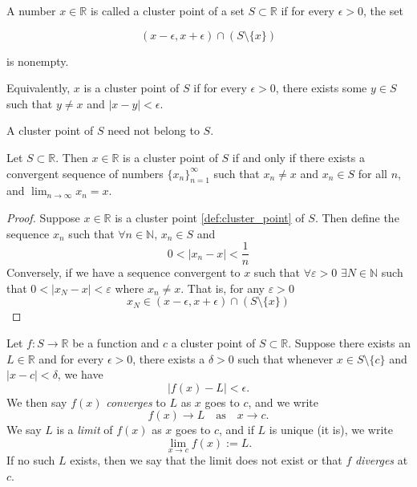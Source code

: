 \documentclass[../main.tex]{subfiles}
\begin{document}
    
    
    
    
    
    
    
    \begin{definition}\label{def:cluster_point}
    A number \( x \in \mathbb{R} \) is called a cluster point of a set \( S \subset \mathbb{R} \) if for every \( \epsilon > 0 \), the set  
    
    \[
    (x - \epsilon, x + \epsilon) \cap (S \setminus \{x\})
    \]
    
    is nonempty.  
    
    Equivalently, \( x \) is a cluster point of \( S \) if for every \( \epsilon > 0 \), there exists some \( y \in S \) such that \( y \neq x \) and \( |x - y| < \epsilon \).  
    
    A cluster point of \( S \) need not belong to \( S \).
    \end{definition}
    
    
    \begin{proposition}
        Let $S \subset \mathbb{R}$. Then $x \in \mathbb{R}$ is a cluster point of $S$ if and only if there exists a convergent sequence of numbers $\{x_n\}_{n=1}^{\infty}$ such that $x_n \neq x$ and $x_n \in S$ for all $n$, and 
        \(
        \lim_{n\to\infty} x_n = x.
        \)
    \end{proposition}

\begin{proof}
Suppose $x\in \mathbb{R}$ is a cluster point \ref{def:cluster_point} of $S$. 
Then define the sequence $x_n$ such that $\forall n \in \mathbb{N}$, $x_n \in S$ and \[
0 < |x_n - x| < \frac{1}{n}
\]
Conversely, if we have a sequence convergent to $x$ such that $\forall \varepsilon > 0$
$\exists N \in \mathbb{N}$ such that $0<|x_N - x| < \varepsilon$ where $x_n \neq x$. That is, for any $\varepsilon > 0$
\[x_N \in (x - \epsilon, x + \epsilon) \cap (S \setminus \{x\})\]
\end{proof}
    
    
    
    
    \begin{definition}
        Let $f : S \to \mathbb{R}$ be a function and $c$ a cluster point of $S \subset \mathbb{R}$. Suppose there exists an $L \in \mathbb{R}$ and for every $\epsilon > 0$, there exists a $\delta > 0$ such that whenever $x \in S \setminus \{c\}$ and $|x - c| < \delta$, we have
        \[
        |f(x) - L| < \epsilon.
        \]
        We then say $f(x)$ \textit{converges} to $L$ as $x$ goes to $c$, and we write
        \[
        f(x) \to L \quad \text{as} \quad x \to c.
        \]
        We say $L$ is a \textit{limit} of $f(x)$ as $x$ goes to $c$, and if $L$ is unique (it is), we write
        \[
        \lim_{x\to c} f(x) := L.
        \]
        If no such $L$ exists, then we say that the limit does not exist or that $f$ \textit{diverges} at $c$.
        
    \end{definition}
        
\end{document}

